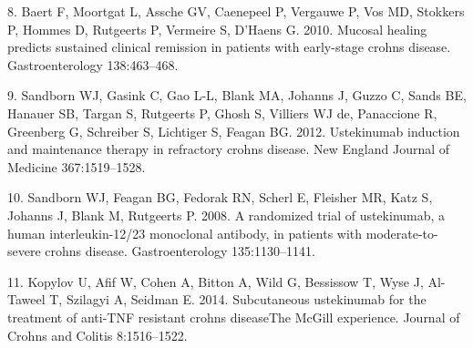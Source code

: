 \documentclass[11pt,]{article}
\begin{document}
\hypertarget{ref-Baert_2010}{}
8. Baert F, Moortgat L, Assche GV, Caenepeel P, Vergauwe P, Vos MD,
Stokkers P, Hommes D, Rutgeerts P, Vermeire S, D'Haens G. 2010. Mucosal
healing predicts sustained clinical remission in patients with
early-stage crohns disease. Gastroenterology 138:463--468.

\hypertarget{ref-Sandborn_2012}{}
9. Sandborn WJ, Gasink C, Gao L-L, Blank MA, Johanns J, Guzzo C, Sands
BE, Hanauer SB, Targan S, Rutgeerts P, Ghosh S, Villiers WJ de,
Panaccione R, Greenberg G, Schreiber S, Lichtiger S, Feagan BG. 2012.
Ustekinumab induction and maintenance therapy in refractory crohns
disease. New England Journal of Medicine 367:1519--1528.

\hypertarget{ref-Sandborn_2008}{}
10. Sandborn WJ, Feagan BG, Fedorak RN, Scherl E, Fleisher MR, Katz S,
Johanns J, Blank M, Rutgeerts P. 2008. A randomized trial of
ustekinumab, a human interleukin-12/23 monoclonal antibody, in patients
with moderate-to-severe crohns disease. Gastroenterology 135:1130--1141.

\hypertarget{ref-Kopylov_2014}{}
11. Kopylov U, Afif W, Cohen A, Bitton A, Wild G, Bessissow T, Wyse J,
Al-Taweel T, Szilagyi A, Seidman E. 2014. Subcutaneous ustekinumab for
the treatment of anti-TNF resistant crohns diseaseThe McGill experience.
Journal of Crohns and Colitis 8:1516--1522.
\end{document}
